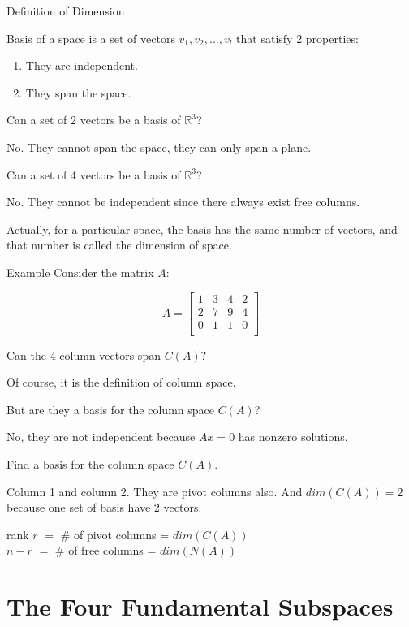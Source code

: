\documentclass{beamer}
\begin{document}
\begin{frame}{Definition of Dimension}
\begin{definition}
Basis of a space is a set of vectors $v_1,v_2,...,v_l$ that satisfy 2 properties:
\begin{enumerate}
    \item They are independent.
    \item They span the space.
\end{enumerate}
\end{definition}

Can a set of 2 vectors be a basis of $\mathbb{R}^3$?

\vspace{3pt}
No. They cannot span the space, they can only span a plane.

\vspace{3pt}
Can a set of 4 vectors be a basis of $\mathbb{R}^3$?

\vspace{3pt}
No. They cannot be independent since there always exist free columns.

\vspace{3pt}
Actually, for a particular space, the basis has the same number of vectors, and that number is called the dimension of space.
\end{frame}

\begin{frame}{Example}
Consider the matrix $A$:

\begin{equation*}
    A=\left[ \begin{matrix}
        1&		3&		4&		2\\
        2&		7&		9&		4\\
        0&		1&		1&		0\\
    \end{matrix} \right]
\end{equation*}

Can the 4 column vectors span $C(A)$?

\vspace{3pt}
Of course, it is the definition of column space.

\vspace{3pt}
But are they a basis for the column space $C(A)$?

\vspace{3pt}
No, they are not independent because $Ax=0$ has nonzero solutions.

\vspace{3pt}
Find a basis for the column space $C(A)$.

\vspace{3pt}
Column 1 and column 2. They are pivot columns also. And $dim(C(A))=2$ because one set of basis have 2 vectors.

\begin{center}
    rank $r$ $=$ \# of pivot columns = $dim(C(A))$\\
    \vspace{3pt}
    $n-r$ $=$ \# of free columns = $dim(N(A))$
\end{center}

\end{frame}

\section{The Four Fundamental Subspaces}
\begin{frame}

\end{frame}
\end{document}
